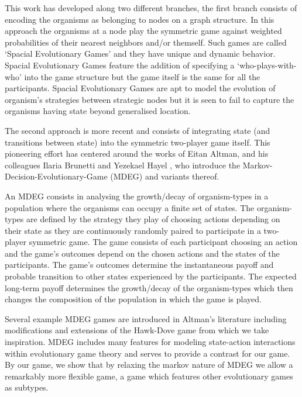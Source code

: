 This work has developed along two different branches, the first branch consists of encoding the organisms as belonging to nodes on a graph structure.\cite{spacial4} In this approach the organisms at a node play the symmetric game against weighted probabilities of their nearest neighbors and/or themself. Such games are called `Spacial Evolutionary Games'\cite{spacial1,nowak} and they have unique and dynamic behavior\cite{spacial2,spacial3}. Spacial Evolutionary Games feature the addition of specifying a `who-plays-with-who' into the game structure but the game itself is the same for all the participants.
Spacial Evolutionary Games are apt to model the evolution of organism's strategies between strategic nodes but it is seen to fail to capture the organisms having state beyond generalised location.

The second approach is more recent and consists of integrating state (and transitions between state) into the symmetric two-player game itself. This pioneering effort has centered around the works of Eitan Altman, and his colleagues Ilaria Brunetti and Yezekael Hayel \cite{markov2,markov3,markov4,markov5,markov8,markov9}, who introduce the Markov-Decision-Evolutionary-Game (MDEG) and variants thereof.

An MDEG consists in analysing the growth/decay of organism-types in a population where the organisms can occupy a finite set of states. The organism-types are defined by the strategy they play of choosing actions depending on their state as they are continuously randomly paired to participate in a two-player symmetric game. The game consists of each participant choosing an action and the game's outcomes depend on the chosen actions and the states of the participants. The game's outcomes determine the instantaneous payoff and probable transition to other states experienced by the participants. The expected long-term payoff determines the growth/decay of the organism-types which then changes the composition of the population in which the game is played.

Several example MDEG games are introduced in Altman's literature including modifications and extensions of the Hawk-Dove game from which we take inspiration.\cite{markov3,markov5}
MDEG includes many features for modeling state-action interactions within evolutionary game theory and serves to provide a contrast for our game. By our game, we show that by relaxing the markov nature of MDEG we allow a remarkably more flexible game, a game which features other evolutionary games as subtypes.


